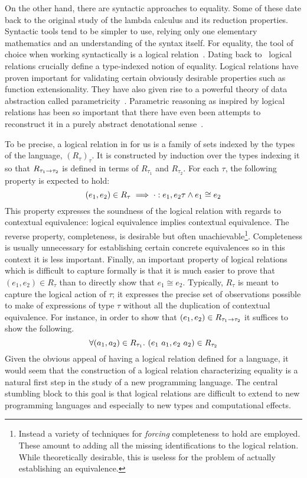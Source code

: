 On the other hand, there are syntactic approaches to equality. Some of
these date back to the original study of the lambda calculus and its
reduction properties. Syntactic tools tend to be simpler to use,
relying only one elementary mathematics and an understanding of the
syntax itself. For equality, the tool of choice when working
syntactically is a logical relation~\citep{TODO-TAIT-AMAL}. Dating
back to~\citet{TODO-TAIT} logical relations crucially define a
type-indexed notion of equality. Logical relations have proven
important for validating certain obviously desirable properties such
as function extensionality. They have also given rise to a powerful
theory of data abstraction called
parametricity~\citep{TODO-REYNOLDS}. Parametric reasoning as inspired
by logical relations has been so important that there have even been
attempts to reconstruct it in a purely abstract denotational
sense~\citep{TODO-FIBRATIONAL}.

To be precise, a logical relation in for us is a family of sets
indexed by the types of the language, $(R_\tau)_\tau$. It is
constructed by induction over the types indexing it so that
$R_{\tau_1 \to \tau_2}$ is defined in terms of $R_{\tau_1}$ and
$R_{\tau_2}$. For each $\tau$, the following property is expected to
hold:
\[
  (e_1, e_2) \in R_\tau \implies
  \cdot \mathrel{:} e_1, e_2{\tau} \land e_1 \cong e_2
\]
This property expresses the soundness of the logical relation with
regards to contextual equivalence: logical equivalence implies
contextual equivalence. The reverse property, completeness, is
desirable but often unachievable\footnote{Instead a variety of
  techniques for \emph{forcing} completeness to hold are
  employed. These amount to adding all the missing identifications to
  the logical relation. While theoretically desirable, this is useless
  for the problem of actually establishing an
  equivalence.}. Completeness is usually unnecessary for establishing
certain concrete equivalences so in this context it is less
important. Finally, an important property of logical relations which
is difficult to capture formally is that it is much easier to prove
that $(e_1, e_2) \in R_\tau$ than to directly show that
$e_1 \cong e_2$. Typically, $R_\tau$ is meant to capture the logical
action of $\tau$; it expresses the precise set of observations
possible to make of expressions of type $\tau$ without all the
duplication of contextual equivalence. For instance, in order to show
that $(e_1, e_2) \in R_{\tau_1 \to \tau_2}$ it suffices to show the
following.
\[
  \forall (a_1, a_2) \in R_{\tau_1}.
  \ (e_1\ a_1, e_2\ a_2) \in R_{\tau_2}
\]
Given the obvious appeal of having a logical relation defined for a
language, it would seem that the construction of a logical relation
characterizing equality is a natural first step in the study of a new
programming language. The central stumbling block to this goal is that
logical relations are difficult to extend to new programming languages
and especially to new types and computational effects.

